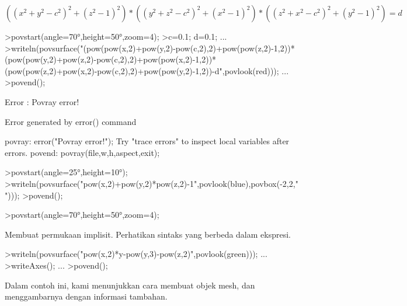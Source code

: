 \documentclass[12pt,Times new roman,letterpaper]{book}
\begin{document}
\begin{eulernootebook}
\begin{eulercomment}
\begin{eulercomment}
\begin{eulernootebook}
\begin{eulercomment}
\begin{eulercomment}
\begin{eulercomment}
\begin{eulercomment}
\begin{eulercomment}
\begin{eulercomment}
\begin{eulercomment}
\begin{eulernotebook}
\begin{eulercomment}
\end{eulercomment}
\begin{eulerformula}
\[
((x^2+y^2-c^2)^2+(z^2-1)^2)*((y^2+z^2-c^2)^2+(x^2-1)^2)*((z^2+x^2-c^2)^2+(y^2-1)^2)=d
\]
\end{eulerformula}
\begin{eulerprompt}
>povstart(angle=70°,height=50°,zoom=4);
>c=0.1; d=0.1; ...
>writeln(povsurface("(pow(pow(x,2)+pow(y,2)-pow(c,2),2)+pow(pow(z,2)-1,2))*(pow(pow(y,2)+pow(z,2)-pow(c,2),2)+pow(pow(x,2)-1,2))*(pow(pow(z,2)+pow(x,2)-pow(c,2),2)+pow(pow(y,2)-1,2))-d",povlook(red))); ...
>povend();
\end{eulerprompt}
\begin{euleroutput}
  Error : Povray error!
  
  Error generated by error() command
  
  povray:
      error("Povray error!");
  Try "trace errors" to inspect local variables after errors.
  povend:
      povray(file,w,h,aspect,exit); 
\end{euleroutput}
\begin{eulerprompt}
>povstart(angle=25°,height=10°); 
>writeln(povsurface("pow(x,2)+pow(y,2)*pow(z,2)-1",povlook(blue),povbox(-2,2,"")));
>povend();
\end{eulerprompt}
\begin{eulerprompt}
>povstart(angle=70°,height=50°,zoom=4);
\end{eulerprompt}
\begin{eulercomment}
Membuat permukaan implisit. Perhatikan sintaks yang berbeda dalam
ekspresi.
\end{eulercomment}
\begin{eulerprompt}
>writeln(povsurface("pow(x,2)*y-pow(y,3)-pow(z,2)",povlook(green))); ...
>writeAxes(); ...
>povend();
\end{eulerprompt}
\begin{eulercomment}
Dalam contoh ini, kami menunjukkan cara membuat objek mesh, dan
menggambarnya dengan informasi tambahan.


\end{eulercomment}
\end{eulernotebook}
\end{eulercomment}
\end{eulercomment}
\end{eulercomment}
\end{eulercomment}
\end{eulercomment}
\end{eulercomment}
\end{eulercomment}
\end{eulernootebook}
\end{eulercomment}
\end{eulercomment}
\end{eulernootebook}
\end{document}
